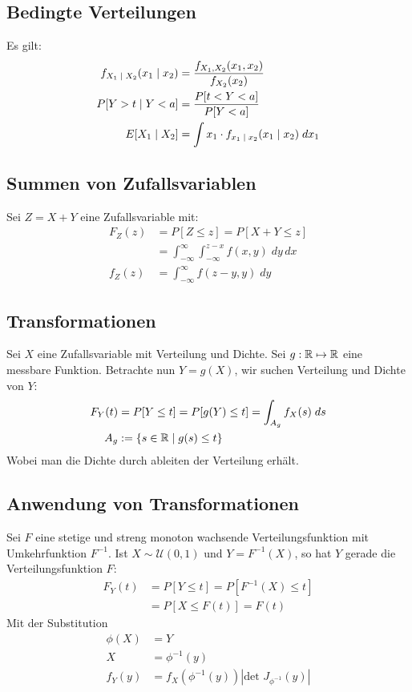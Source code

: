 \subsection*{Bedingte Verteilungen}
Es gilt:
\begin{align*}
  f_{X_1 \; | \; X_2} (x_1 \; | \; x_2) & = \frac{f_{X_1,  X_2} (x_1,  x_2)}{f_{X_2} (x_2)}              \\
  P[Y > t \; | \; Y < a]                   & = \frac{P[t < Y < a]}{P[Y < a]}                                \\
  E[X_1 \; | \; X_2]                    & = \int x_1 \cdot f_{x_1 \; | \; x_2} (x_1 \; | \; x_2) \; dx_1
\end{align*}
\subsection*{Summen von Zufallsvariablen}
Sei $Z = X + Y$ eine Zufallsvariable mit:
\begin{align*}
  F_Z (z) & = P[Z \leq z] = P[X + Y \leq z]                                     \\
          & = \int_{-\infty}^\infty \int_{-\infty}^{z - x} f (x, y )\; dy \, dx \\
  f_Z (z) & = \int_{-\infty}^\infty f (z - y, y) \; dy
\end{align*}
\subsection*{Transformationen}
Sei $X$ eine Zufallsvariable mit Verteilung und Dichte. Sei $g: \mathbb{R} \mapsto \mathbb{R}$
eine messbare Funktion. Betrachte nun $Y = g (X)$, wir suchen Verteilung und
Dichte von $Y$:
\begin{align*}
  F_Y (t) & = P[Y \leq t] = P[g (Y) \leq t] = \int_{A_g} f_X (s) \; ds \\
  A_g     & := \{s \in \mathbb{R} \; | \; g (s) \leq t\}
\end{align*}
Wobei man die Dichte durch ableiten der Verteilung erhält.
\subsection*{Anwendung von Transformationen}
Sei $F$ eine stetige und streng monoton wachsende Verteilungsfunktion mit
Umkehrfunktion $F^{-1}$. Ist $X \sim \mathcal{U} (0, 1)$ und $Y = F^{-1} (X)$,
so hat $Y$ gerade die Verteilungsfunktion $F$:
\begin{align*}
  F_Y (t) & = P[Y \leq t] = P[F^{-1} (X) \leq t] \\
          & = P[X \leq F (t)] = F (t)
\end{align*}
Mit der Substitution
\begin{align*}
  \phi(X) & = Y                                              \\
  X       & = \phi^{-1}(y)                                   \\
  f_Y(y)  & = f_X(\phi^{-1}(y))|\text{det }J_{\phi^{-1}}(y)| \\
\end{align*}
\BoxStart{}
